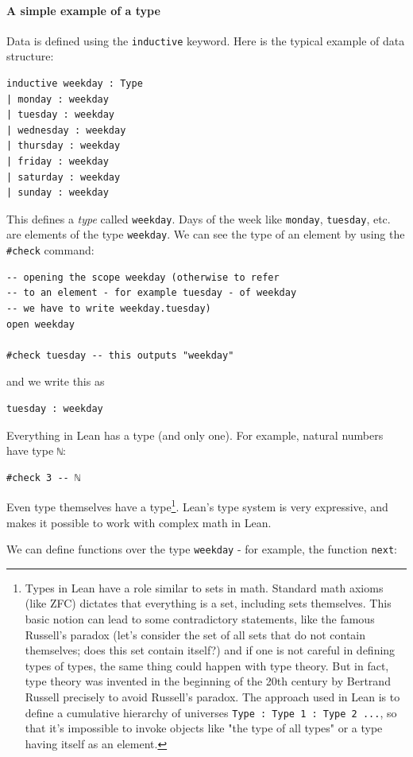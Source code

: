 \documentclass{book}
\theoremstyle{definition}
\theoremstyle{remark}
\theoremstyle{plain}
\begin{document}
\paragraph{A simple example of a type}
Data is defined using the \lstinline{inductive} keyword.
Here is the typical example of data structure:
\begin{lstlisting}
inductive weekday : Type
| monday : weekday
| tuesday : weekday
| wednesday : weekday
| thursday : weekday
| friday : weekday
| saturday : weekday
| sunday : weekday
\end{lstlisting}
This defines a \textit{type} called \lstinline{weekday}.
Days of the week like \lstinline{monday}, \lstinline{tuesday}, etc. are elements of the type \lstinline{weekday}.
We can see the type of an element by using the \lstinline{#check} command:
\begin{lstlisting}
-- opening the scope weekday (otherwise to refer
-- to an element - for example tuesday - of weekday
-- we have to write weekday.tuesday)
open weekday

#check tuesday -- this outputs "weekday"
\end{lstlisting}
and we write this as
\begin{lstlisting}
tuesday : weekday
\end{lstlisting}
Everything in Lean has a type (and only one). For example, natural numbers have type \lstinline{ℕ}:
\begin{lstlisting}
#check 3 -- ℕ
\end{lstlisting}
Even type themselves have a type\footnote{Types in Lean have a role similar to sets in math.
Standard math axioms (like ZFC) dictates that everything is a set, including sets themselves.
This basic notion can lead to some contradictory statements, like the famous Russell's paradox
(let's consider the set of all sets that do not contain themselves; does this set contain itself?)
and if one is not careful in defining types of types, the same thing could happen with type theory.
But in fact, type theory was invented in the beginning of the 20th century by Bertrand Russell precisely to avoid Russell's paradox.
The approach used in Lean is to define a cumulative hierarchy of universes \lstinline{Type : Type 1 : Type 2 ...},
so that it's impossible to invoke objects like "the type of all types" or a type having itself as an element.}.
Lean's type system is very expressive, and makes it possible to work with complex math in Lean.

We can define functions over the type \lstinline{weekday} -
for example, the function \lstinline{next}:
\end{document}
